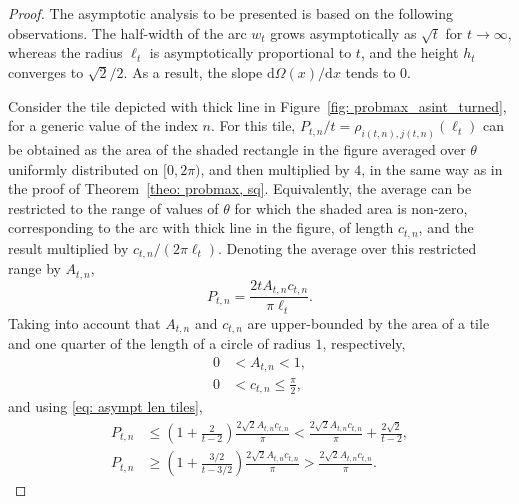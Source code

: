 \documentclass[12pt, a4paper]{article}
\newcommand{\diff}{\mathrm d}
\newcommand{\probmax}{\rho} %
\newcommand{\len}{\ell} %
\newcommand{\tiles}{t} %
\newcommand{\funcirc}{\Omega}
\begin{document}
\begin{proof}
The asymptotic analysis to be presented is based on the following observations. The half-width of the arc $w_\tiles$ grows asymptotically as $\sqrt{\tiles}$ for $\tiles \rightarrow \infty$, whereas the radius $\len_\tiles$ is asymptotically proportional to  $\tiles$, and the height $h_\tiles$ converges to $\sqrt{2}/2$. As a result, the slope $\diff \funcirc(x)/\diff x$ tends to $0$.

Consider the tile depicted with thick line in Figure~\ref{fig: probmax_asint_turned}, for a generic value of the index $n$. For this tile, $P_{\tiles,n}/t = \probmax_{i(\tiles,n),j(\tiles,n)}(\len_\tiles)$ can be obtained as the area of the shaded rectangle in the figure averaged over $\theta$ uniformly distributed on $[0,2\pi)$, and then multiplied by $4$, in the same way as in the proof of Theorem~\ref{theo: probmax, sq}. Equivalently, the average can be restricted to the range of values of $\theta$ for which the shaded area is non-zero, corresponding to the arc with thick line in the figure, of length $c_{\tiles,n}$, and the result multiplied by $c_{\tiles,n}/(2\pi\len_\tiles)$. Denoting the average over this restricted range by $A_{\tiles,n}$,
\begin{equation}
\label{eq: P i j asympt 1}
P_{\tiles,n} = \frac{2 \tiles A_{\tiles,n} c_{\tiles,n}}{\pi\len_\tiles}.
\end{equation}
Taking into account that $A_{\tiles,n}$ and $c_{\tiles,n}$ are upper-bounded by the area of a tile and one quarter of the length of a circle of radius $1$, respectively,
\begin{align}
\label{eq: A tiles n bound}
0 &< A_{\tiles,n} < 1, \\
\label{eq: c tiles n bound}
0 &< c_{\tiles,n} \leq \frac \pi 2,
\end{align}
and using \eqref{eq: asympt len tiles},
\begin{align}
\label{eq: P i j asympt 2 1}
P_{\tiles,n}
&\leq \left(1 + \frac 2 {\tiles-2} \right) \frac{2 \sqrt{2} A_{\tiles,n} c_{\tiles,n}}{\pi} < \frac{2\sqrt{2} A_{\tiles,n} c_{\tiles,n}}{\pi} + \frac{2\sqrt{2}}{\tiles-2}, \\
\label{eq: P i j asympt 2 2}
P_{\tiles,n}
&\geq \left(1 + \frac {3/2} {\tiles-3/2} \right) \frac{2 \sqrt{2} A_{\tiles,n} c_{\tiles,n}}{\pi} > \frac{2 \sqrt{2} A_{\tiles,n} c_{\tiles,n}}{\pi}.
\end{align}


\end{proof}
\end{document}
